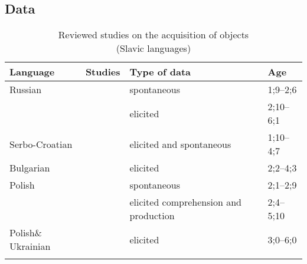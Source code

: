 \documentclass[output=paper,modfonts,newtxmath,hidelinks,]{langscibook}
\begin{document}
\subsection{Data}\label{17:sec:key:3.1}


\begin{table}[b]
	\captionsetup{format=hang}
	\caption{Reviewed studies on the acquisition of objects\\(Slavic languages)}
	\footnotesize
    \begin{tabularx}{\textwidth}{p{2cm}Q@{}ll}
    \lsptoprule
     \textbf{Language} & \textbf{Studies} & \textbf{Type of data} & \textbf{Age}\\
     \midrule
     {Russian} & \citet{Gordishevsky-Avrutin2004} & spontaneous  & 1;9--2;6\vspace{5pt}\\ 
	    & \citet{Frolova2016,Frolova} 	& elicited  & 2;10--6;1\vspace{10pt}\\
 	
 	Serbo-{Croatian} & \citet{Stiasny2003,Stiasny2006} & elicited and spontaneous  & 1;10--4;7\vspace{10pt}\\
 	
     {Bulgarian} & \citet{Radeva-Bork2013,Radeva-Bork2015} & elicited  & 2;2--4;3\vspace{10pt}\\
     
     {Polish} & \citet{Tryzna2015} & spontaneous  & 2;1--2;9\\
	  & 				 & elicited comprehension and production  & 2;4--5;10\vspace{10pt}\\
 	
     {Polish}\newline\& {Ukrainian} & \citet{Mykhaylyk-Sopata2016} & elicited  & 3;0--6;0\\
\lspbottomrule	
\end{tabularx} 
\label{17:table:table_1}
\end{table}
\end{document}

